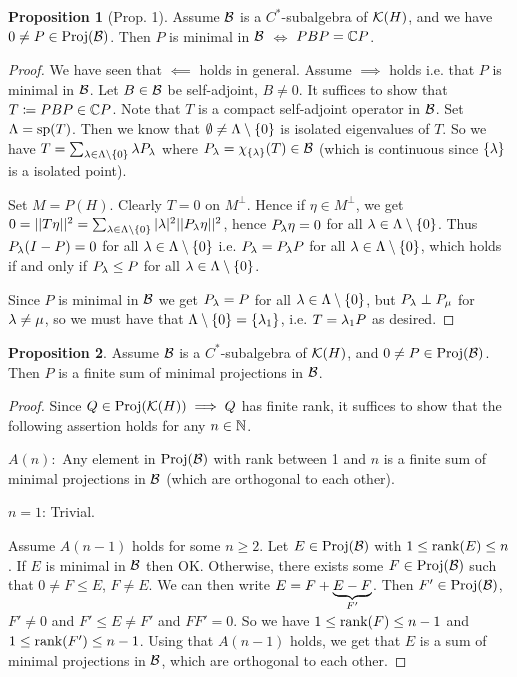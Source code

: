 \documentclass[10pt,english,a4paper]{article}
\theoremstyle{definition}
\newtheorem*{proposition}{Proposition}
\DeclareMathOperator{\Proj}{Proj}
\DeclareMathOperator{\Sp}{sp}
\begin{document}
\begin{proposition}[Prop. 1]
    Assume $\mathcal{B}$ is a $C^*$-subalgebra of $\mathcal{K}(H)$, and we have $0\neq P\in \Proj(\Bs)$.
Then $P$ is minimal in $\mathcal{B}$ $\iff$ $PBP = \mathbb{C} P$.
\end{proposition}
\begin{proof}
    We have seen that $\impliedby$ holds in general. 
Assume $\implies$ holds i.e. that $P$ is minimal in $\mathcal{B}$.
Let $B\in \mathcal{B}$ be self-adjoint, $B\neq 0$. It suffices to show that $T\coloneqq PBP \in \mathbb{C} P$.
Note that $T$ is a compact self-adjoint operator in $\mathcal{B}$. Set $\La = \Sp(T)$.
Then we know that $\emptyset \neq \Lambda \setminus \{0\}$ is isolated eigenvalues
of $T$. So we have $T = \sum_{\lambda \in \Lambda\setminus\{0\}} \lambda P_{\lambda}$ where
$P_{\lambda} = \chi_{\{\lambda\}}(T) \in \mathcal{B}$ (which is continuous since $\{\lambda\}$ is
a isolated point). 

Set $M = P(H)$. Clearly $T = 0$ on $M^{\perp}$. Hence if $\eta \in M^{\perp}$, 
we get $0 = ||T\eta||^2 = \sum_{\lambda \in \Lambda\setminus\{0\}} |\lambda|^2 ||P_{\lambda}\eta||^2$,
hence $P_{\lambda}\eta = 0$ for all $\lambda \in \Lambda\setminus\{0\}$. 
Thus $P_{\lambda} (I-P)= 0 $ for all $\lambda \in \Lambda\setminus\{0\}$
i.e. $P_{\lambda} = P_{\lambda}P$ for all $\lambda \in \Lambda\setminus\{0\}$,
which holds if and only if $P_{\lambda}\leq P$ for all $\lambda \in \Lambda\setminus\{0\}$.

Since $P$ is minimal in $\mathcal{B}$ we get $P_{\lambda} = P$ for all $\lambda \in \Lambda\setminus\{0\}$,
but $P_{\lambda}\perp P_{\mu}$ for $\lambda \neq \mu$, so we must have that $\Lambda
\setminus \{0\} = \{\lambda_1\}$, i.e. $T = \lambda_1 P$ as desired. 
\end{proof}

\begin{proposition}
    Assume $\mathcal{B}$ is a $C^*$-subalgebra of $\mathcal{K}(H)$, and $0\neq P\in \Proj(\Bs)$.
Then $P$ is a finite sum of minimal projections in $\mathcal{B}$.
\end{proposition}
\begin{proof}
    Since $Q \in \Proj(\Ks(H)) \implies Q$ has finite rank, it suffices to show that the
following assertion holds for any $n\in \mathbb{N}$. 

$A(n):$ Any element in $\Proj(\Bs)$ with rank between 1 and $n$ is a finite sum of 
minimal projections in $\mathcal{B}$ (which are orthogonal to each other).

\ul{$n=1$}: Trivial.

Assume $A(n-1)$ holds for some $n\geq 2$.
Let $E \in \Proj(\Bs)$ with $1\leq \textnormal{rank}(E)\leq n$.
If $E$ is minimal in $\mathcal{B}$ then OK. Otherwise, there exists some $F \in \Proj (\Bs)$
such that $0\neq F \leq E$, $F\neq E$. We can then write $E = F + \underbrace{E - F}_{F'}$.
Then $F' \in \Proj(\Bs)$, $F' \neq 0$ and $F'\leq E \neq F'$ and $FF' = 0$.
So we have $1\leq \textnormal{rank}(F)\leq n-1$ and $1\leq \textnormal{rank}(F') \leq n-1$.
Using that $A(n-1)$ holds, we get that $E$ is a sum of minimal projections in $\mathcal{B}$,
which are orthogonal to each other.
\end{proof}
\end{document}
